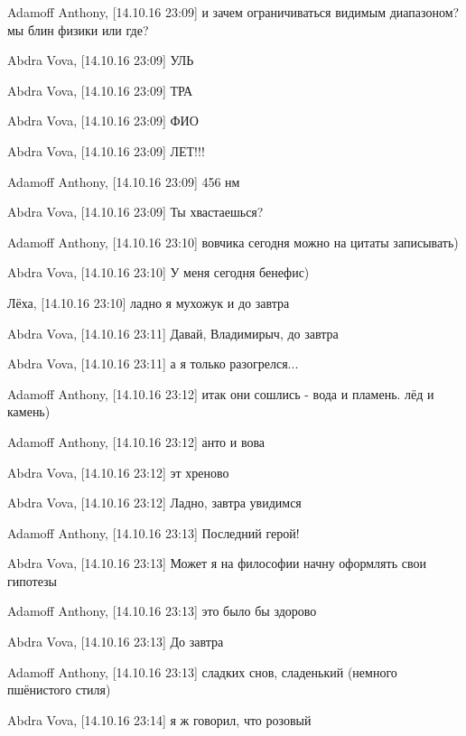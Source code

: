 Adamoff Anthony, [14.10.16 23:09]
и зачем ограничиваться видимым диапазоном? мы блин физики или где?

Abdra Vova, [14.10.16 23:09]
УЛЬ

Abdra Vova, [14.10.16 23:09]
ТРА

Abdra Vova, [14.10.16 23:09]
ФИО

Abdra Vova, [14.10.16 23:09]
ЛЕТ!!!

Adamoff Anthony, [14.10.16 23:09]
456 нм

Abdra Vova, [14.10.16 23:09]
Ты хвастаешься?

Adamoff Anthony, [14.10.16 23:10]
вовчика сегодня можно на цитаты записывать)

Abdra Vova, [14.10.16 23:10]
У меня сегодня бенефис)

Лёха, [14.10.16 23:10]
ладно я мухожук
и до завтра

Abdra Vova, [14.10.16 23:11]
Давай, Владимирыч, до завтра

Abdra Vova, [14.10.16 23:11]
а я только разогрелся...

Adamoff Anthony, [14.10.16 23:12]
итак они сошлись - вода и пламень. лёд и камень)

Adamoff Anthony, [14.10.16 23:12]
анто и вова

Abdra Vova, [14.10.16 23:12]
эт хреново

Abdra Vova, [14.10.16 23:12]
Ладно, завтра увидимся

Adamoff Anthony, [14.10.16 23:13]
Последний герой!

Abdra Vova, [14.10.16 23:13]
Может я на философии начну оформлять свои гипотезы

Adamoff Anthony, [14.10.16 23:13]
это было бы здорово

Abdra Vova, [14.10.16 23:13]
До завтра

Adamoff Anthony, [14.10.16 23:13]
сладких снов, сладенький (немного пшёнистого стиля)

Abdra Vova, [14.10.16 23:14]
я ж говорил, что розовый

